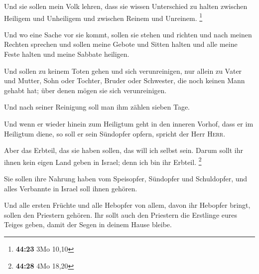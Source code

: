  Und sie sollen mein Volk lehren, dass sie wissen
Unterschied zu halten zwischen Heiligem und Unheiligem und zwischen
Reinem und Unreinem. \footnote{\textbf{44:23} 3Mo 10,10}

 Und wo eine Sache vor sie kommt, sollen sie stehen und
richten und nach meinen Rechten sprechen und sollen meine Gebote und
Sitten halten und alle meine Feste halten und meine Sabbate heiligen.

 Und sollen zu keinem Toten gehen und sich verunreinigen,
nur allein zu Vater und Mutter, Sohn oder Tochter, Bruder oder
Schwester, die noch keinen Mann gehabt hat; über denen mögen sie sich
verunreinigen.

 Und nach seiner Reinigung soll man ihm zählen sieben
Tage.

 Und wenn er wieder hinein zum Heiligtum geht in den
inneren Vorhof, dass er im Heiligtum diene, so soll er sein Sündopfer
opfern, spricht der Herr \textsc{Herr}.

 Aber das Erbteil, das sie haben sollen, das will ich
selbst sein. Darum sollt ihr ihnen kein eigen Land geben in Israel; denn
ich bin ihr Erbteil. \footnote{\textbf{44:28} 4Mo 18,20}

 Sie sollen ihre Nahrung haben vom Speisopfer, Sündopfer
und Schuldopfer, und alles Verbannte in Israel soll ihnen gehören.

 Und alle ersten Früchte und alle Hebopfer von allem,
davon ihr Hebopfer bringt, sollen den Priestern gehören. Ihr sollt auch
den Priestern die Erstlinge eures Teiges geben, damit der Segen in
deinem Hause bleibe.


